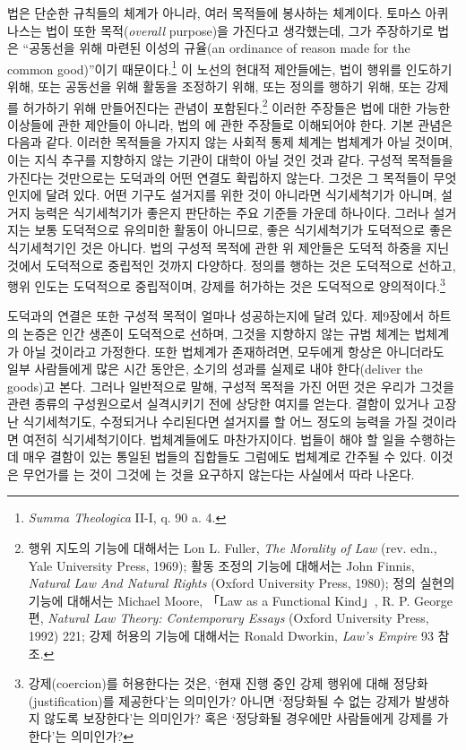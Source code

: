 법은 단순한 규칙들의 체계가 아니라, 여러 목적들에 봉사하는 체계이다.
토마스 아퀴나스는 법이 또한  목적(\emph{overall} purpose)을
가진다고 생각했는데, 그가 주장하기로 법은 “공동선을 위해 마련된 이성의
규율(an ordinance of reason made for the common good)”이기
때문이다.\footnote{\emph{Summa Theologica} II-I, q. 90 a. 4.} 이 노선의
현대적 제안들에는, 법이 행위를 인도하기 위해, 또는 공동선을 위해 활동을
조정하기 위해, 또는 정의를 행하기 위해, 또는 강제를 허가하기 위해
만들어진다는 관념이 포함된다.\footnote{행위 지도의 기능에 대해서는 Lon
  L. Fuller, \emph{The Morality of Law} (rev. edn., Yale University
  Press, 1969); 활동 조정의 기능에 대해서는 John Finnis, \emph{Natural
  Law And Natural Rights} (Oxford University Press, 1980); 정의 실현의
  기능에 대해서는 Michael Moore, 「Law as a Functional Kind」, R. P.
  George 편, \emph{Natural Law Theory: Contemporary Essays} (Oxford
  University Press, 1992) 221; 강제 허용의 기능에 대해서는 Ronald
  Dworkin, \emph{Law's Empire} 93 참조.} 이러한 주장들은 법에 대한
가능한 이상들에 관한 제안들이 아니라, 법의 에 관한 주장들로 이해되어야 한다. 기본 관념은
다음과 같다. 이러한 목적들을 가지지 않는 사회적 통제 체계는 법체계가
아닐 것이며, 이는 지식 추구를 지향하지 않는 기관이 대학이 아닐 것인 것과
같다. 구성적 목적들을 가진다는 것만으로는 도덕과의 어떤 연결도 확립하지
않는다. 그것은 그 목적들이 무엇인지에 달려 있다. 어떤 기구도 설거지를
위한 것이 아니라면 식기세척기가 아니며, 설거지 능력은 식기세척기가
좋은지 판단하는 주요 기준들 가운데 하나이다. 그러나 설거지는 보통
도덕적으로 유의미한 활동이 아니므로, 좋은 식기세척기가 도덕적으로 좋은
식기세척기인 것은 아니다. 법의 구성적 목적에 관한 위 제안들은 도덕적
하중을 지닌 것에서 도덕적으로 중립적인 것까지 다양하다. 정의를 행하는
것은 도덕적으로 선하고, 행위 인도는 도덕적으로 중립적이며, 강제를
허가하는 것은 도덕적으로 양의적이다.\footnote{강제(coercion)를
  허용한다는 것은, ‘현재 진행 중인 강제 행위에 대해
  정당화(justification)를 제공한다’는 의미인가? 아니면 ‘정당화될 수 없는
  강제가 발생하지 않도록 보장한다’는 의미인가? 혹은 ‘정당화될 경우에만
  사람들에게 강제를 가한다’는 의미인가?}

도덕과의 연결은 또한 구성적 목적이 얼마나 성공하는지에 달려 있다.
제9장에서 하트의 논증은 인간 생존이 도덕적으로 선하며, 그것을 지향하지
않는 규범 체계는 법체계가 아닐 것이라고 가정한다. 또한 법체계가
존재하려면, 모두에게 항상은 아니더라도 일부 사람들에게 많은 시간 동안은,
소기의 성과를 실제로 내야 한다(deliver the goods)고 본다. 그러나
일반적으로 말해, 구성적 목적을 가진 어떤 것은 우리가 그것을 관련 종류의
구성원으로서 실격시키기 전에 상당한 여지를 얻는다. 결함이 있거나 고장 난
식기세척기도, 수정되거나 수리된다면 설거지를 할 어느 정도의 능력을 가질
것이라면 여전히 식기세척기이다. 법체계들에도 마찬가지이다. 법들이 해야
할 일을 수행하는 데 매우 결함이 있는 통일된 법들의 집합들도 그럼에도
법체계로 간주될 수 있다. 이것은 무언가를 는 것이
그것에 는 것을 요구하지 않는다는 사실에서
따라 나온다.

